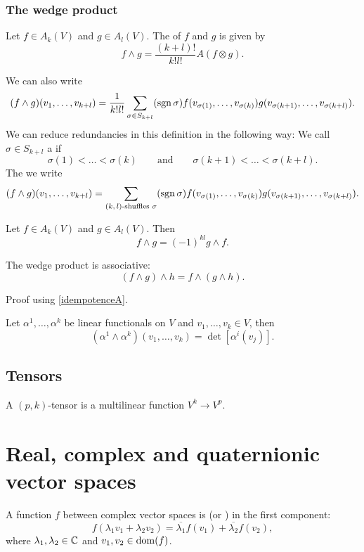 \subsubsection{The wedge product}
\begin{definition}
Let $f\in A_k(V)$ and $g\in A_l(V)$. The  of $f$ and $g$ is given by
\[ f\wedge g = \frac{(k+l)!}{k!l!}A(f\otimes g). \]
\end{definition}
We can also write
\[ (f\wedge g)(v_1,\ldots,v_{k+l}) = \frac{1}{k!l!}\sum_{\sigma\in S_{k+l}}(\operatorname{sgn} \sigma)f(v_{\sigma(1)},\ldots,v_{\sigma(k)})g(v_{\sigma(k+1)},\ldots, v_{\sigma(k+l)}). \]
We can reduce redundancies in this definition in the following way:
We call $\sigma\in S_{k+l}$ a  if
\[ \sigma(1)<\ldots<\sigma(k) \qquad \text{and}\qquad \sigma(k+1)<\ldots<\sigma(k+l). \]
The we write
\[ (f\wedge g)(v_1,\ldots,v_{k+l}) = \sum_{\text{$(k,l)$-shuffles $\sigma$}}(\operatorname{sgn} \sigma)f(v_{\sigma(1)},\ldots,v_{\sigma(k)})g(v_{\sigma(k+1)},\ldots, v_{\sigma(k+l)}). \]
\begin{proposition}
Let $f\in A_k(V)$ and $g\in A_l(V)$. Then
\[ f\wedge g = (-1)^{kl}g\wedge f. \]
\end{proposition}
\begin{lemma}
The wedge product is associative:
\[ (f\wedge g)\wedge h = f\wedge (g\wedge h). \]
\end{lemma}
Proof using \ref{idempotenceA}.

\begin{lemma}
Let $\alpha^1,\ldots, \alpha^k$ be linear functionals on $V$ and $v_1,\ldots,v_k\in V$, then
\[ (\alpha^1\wedge\alpha^k)(v_1,\ldots, v_k) = \det[\alpha^i(v_j)]. \]
\end{lemma}

\subsection{Tensors}
A $(p,k)$-tensor is a multilinear function $V^k\to V^p$.

\section{Real, complex and quaternionic vector spaces}
\begin{definition}
A function $f$ between complex vector spaces is  (or ) in the first component:
\[f(\lambda_1 v_1 + \lambda_2 v_2) = \overline{\lambda_1}f(v_1) + \overline{\lambda_2}f(v_2),\]
where $\lambda_1,\lambda_2 \in \mathbb{C}$ and $v_1,v_2\in \operatorname{dom}(f)$.
\end{definition}
